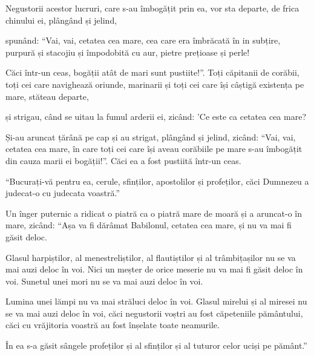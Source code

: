 {Negustorii acestor lucruri, care s-au îmbogățit prin ea, vor sta departe, de frica chinului ei, plângând și jelind,

spunând: “Vai, vai, cetatea cea mare, cea care era îmbrăcată în in subțire, purpură și stacojiu și împodobită cu aur, pietre prețioase și perle!

Căci într-un ceas, bogății atât de mari sunt pustiite!”. Toți căpitanii de corăbii, toți cei care navighează oriunde, marinarii și toți cei care își câștigă existența pe mare, stăteau departe,

și strigau, când se uitau la fumul arderii ei, zicând: 'Ce este ca cetatea cea mare?

Și-au aruncat țărână pe cap și au strigat, plângând și jelind, zicând: “Vai, vai, cetatea cea mare, în care toți cei care își aveau corăbiile pe mare s-au îmbogățit din cauza marii ei bogății!”. Căci ea a fost pustiită într-un ceas.


\par }{\PP {}“Bucurați-vă pentru ea, cerule, sfinților, apostolilor și profeților, căci Dumnezeu a judecat-o cu judecata voastră.”


\par }{\PP {}Un înger puternic a ridicat o piatră ca o piatră mare de moară și a aruncat-o în mare, zicând: “Așa va fi dărâmat Babilonul, cetatea cea mare, și nu va mai fi găsit deloc.

Glasul harpiștilor, al menestreliștilor, al flautiștilor și al trâmbițașilor nu se va mai auzi deloc în voi. Nici un meșter de orice meserie nu va mai fi găsit deloc în voi. Sunetul unei mori nu se va mai auzi deloc în voi.

Lumina unei lămpi nu va mai străluci deloc în voi. Glasul mirelui și al miresei nu se va mai auzi deloc în voi, căci negustorii voștri au fost căpeteniile pământului, căci cu vrăjitoria voastră au fost înșelate toate neamurile.

În ea s-a găsit sângele profeților și al sfinților și al tuturor celor uciși pe pământ.”



\par }
